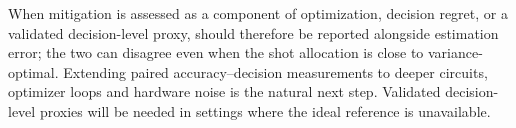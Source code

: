 When mitigation is assessed as a component of optimization, decision regret, or a validated decision-level proxy, should therefore be reported alongside estimation error; the two can disagree even when the shot allocation is close to variance-optimal. Extending paired accuracy--decision measurements to deeper circuits, optimizer loops and hardware noise is the natural next step. Validated decision-level proxies will be needed in settings where the ideal reference is unavailable.
